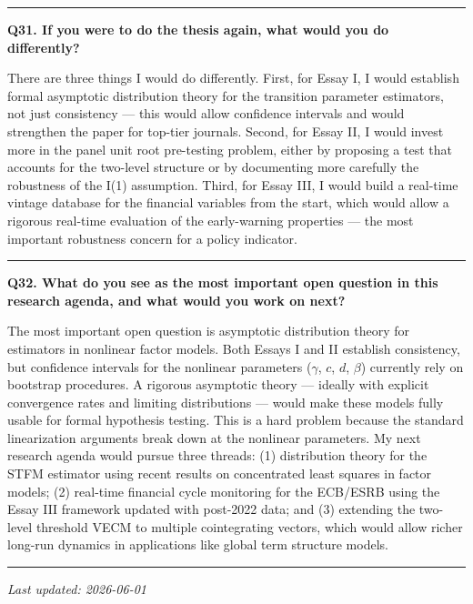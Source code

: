 \documentclass[11pt,a4paper]{article}
\begin{document}
\medskip\hrule\medskip

\textbf{Q31. If you were to do the thesis again, what would you do differently?}

There are three things I would do differently. First, for Essay I, I would establish formal asymptotic distribution theory for the transition parameter estimators, not just consistency — this would allow confidence intervals and would strengthen the paper for top-tier journals. Second, for Essay II, I would invest more in the panel unit root pre-testing problem, either by proposing a test that accounts for the two-level structure or by documenting more carefully the robustness of the I(1) assumption. Third, for Essay III, I would build a real-time vintage database for the financial variables from the start, which would allow a rigorous real-time evaluation of the early-warning properties — the most important robustness concern for a policy indicator.

\medskip\hrule\medskip

\textbf{Q32. What do you see as the most important open question in this research agenda, and what would you work on next?}

The most important open question is asymptotic distribution theory for estimators in nonlinear factor models. Both Essays I and II establish consistency, but confidence intervals for the nonlinear parameters ($\gamma$, $c$, $d$, $\beta$) currently rely on bootstrap procedures. A rigorous asymptotic theory — ideally with explicit convergence rates and limiting distributions — would make these models fully usable for formal hypothesis testing. This is a hard problem because the standard linearization arguments break down at the nonlinear parameters. My next research agenda would pursue three threads: (1) distribution theory for the STFM estimator using recent results on concentrated least squares in factor models; (2) real-time financial cycle monitoring for the ECB/ESRB using the Essay III framework updated with post-2022 data; and (3) extending the two-level threshold VECM to multiple cointegrating vectors, which would allow richer long-run dynamics in applications like global term structure models.

\medskip\hrule\medskip

\textit{Last updated: 2026-06-01}
\end{document}
